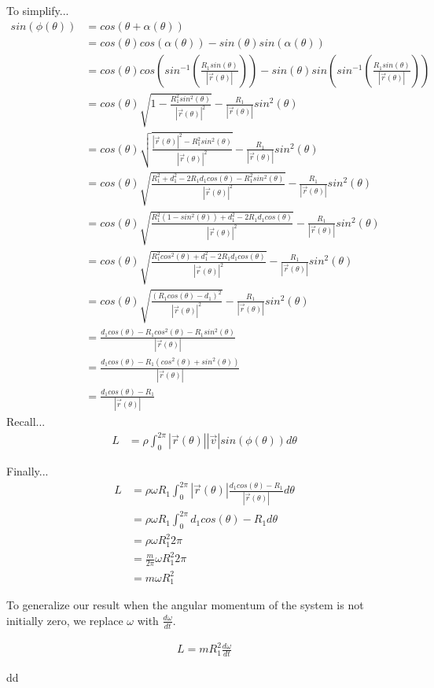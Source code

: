 \documentclass{article}
\begin{document}
	To simplify...
	\begin{align}
		sin(\phi(\theta)) &= cos(\theta + \alpha(\theta)) \\
		 &= cos(\theta)cos(\alpha(\theta)) - sin(\theta)sin(\alpha(\theta)) \\
		 &= cos(\theta)cos(sin^{-1}(\frac{R_1sin(\theta)}{|\vec{r}(\theta)|})) - sin(\theta)sin(sin^{-1}(\frac{R_1sin(\theta)}{|\vec{r}(\theta)|})) \\
		 &= cos(\theta)\sqrt{1-\frac{R_1^2sin^2(\theta)}{|\vec{r}(\theta)|^2}} - \frac{R_1}{|\vec{r}(\theta)|}sin^2(\theta) \\
		 &= cos(\theta)\sqrt{\frac{|\vec{r}(\theta)|^2 - R_1^2sin^2(\theta)}{|\vec{r}(\theta)|^2}} - \frac{R_1}{|\vec{r}(\theta)|}sin^2(\theta) \\
		 &= cos(\theta)\sqrt{\frac{R_1^2+d_1^2-2R_1d_1cos(\theta)- R_1^2sin^2(\theta)}{|\vec{r}(\theta)|^2}} - \frac{R_1}{|\vec{r}(\theta)|}sin^2(\theta) \\
		 &= cos(\theta)\sqrt{\frac{R_1^2(1-sin^2(\theta))+d_1^2-2R_1d_1cos(\theta)}{|\vec{r}(\theta)|^2}} - \frac{R_1}{|\vec{r}(\theta)|}sin^2(\theta) \\
		 &= cos(\theta)\sqrt{\frac{R_1^2cos^2(\theta)+d_1^2-2R_1d_1cos(\theta)}{|\vec{r}(\theta)|^2}} - \frac{R_1}{|\vec{r}(\theta)|}sin^2(\theta) \\
		 &= cos(\theta)\sqrt{\frac{(R_1cos(\theta) - d_1)^2}{|\vec{r}(\theta)|^2}} - \frac{R_1}{|\vec{r}(\theta)|}sin^2(\theta) \\
		 &= \frac{d_1cos(\theta) - R_1cos^2(\theta) - R_1sin^2(\theta)}{|\vec{r}(\theta)|} \\
		 &= \frac{d_1cos(\theta) - R_1(cos^2(\theta) + sin^2(\theta))}{|\vec{r}(\theta)|} \\
		 &= \frac{d_1cos(\theta) - R_1}{|\vec{r}(\theta)|}
	\end{align}
	Recall...
	\begin{align}
		L &= \rho\int_0^{2\pi}|\vec{r}(\theta)||\vec{v}|sin(\phi(\theta))d\theta
	\end{align}

	Finally...
	\begin{align}
		L &=\rho\omega R_1\int_0^{2\pi}|\vec{r}(\theta)|\frac{d_1cos(\theta) - R_1}{|\vec{r}(\theta)|}d\theta \\
		 &= \rho\omega R_1\int_0^{2\pi}d_1cos(\theta) - R_1 d\theta \\
		 &= \rho\omega R_1^2 2\pi \\
		 &= \frac{m}{2\pi} \omega R_1^2 2\pi  \\
		 &= m \omega R_1^2
	\end{align}

	To generalize our result when the angular momentum of the system is not initially zero,
	we replace $\omega$ with $\frac{d\omega}{dt}$.

	\begin{align}
		L = mR_1^2\frac{d\omega}{dt}
	\end{align}

	dd
	
\end{document}
